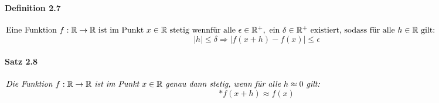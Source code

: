 \documentclass[a4paper]{article}
\begin{document}
\paragraph{Definition 2.7} $ \text{Eine Funktion } f:\mathbb{R} \to \mathbb{R} \text{ ist im Punkt } x \in \mathbb{R} \text{ stetig wenn}\\
\text{für alle }\epsilon \in \mathbb{R}^+, \text{ ein } \delta  \in \mathbb{R}^+ \text{ existiert, sodass für alle } h \in \mathbb{R} \text{ gilt:}$
$$  |h| \leqslant \delta \Rightarrow |f(x + h) - f(x)| \leqslant \epsilon $$ 

\paragraph{Satz 2.8} $ \textit{Die Funktion } f:\mathbb{R} \to \mathbb{R} \textit{ ist im Punkt } x \in \mathbb{R} \textit{ genau dann stetig,}
\textit{ wenn für alle }\\ h \approx 0 \textit{ gilt:} $
$$ \text{*}f(x + h) \approx f(x) $$ 
\end{document}
